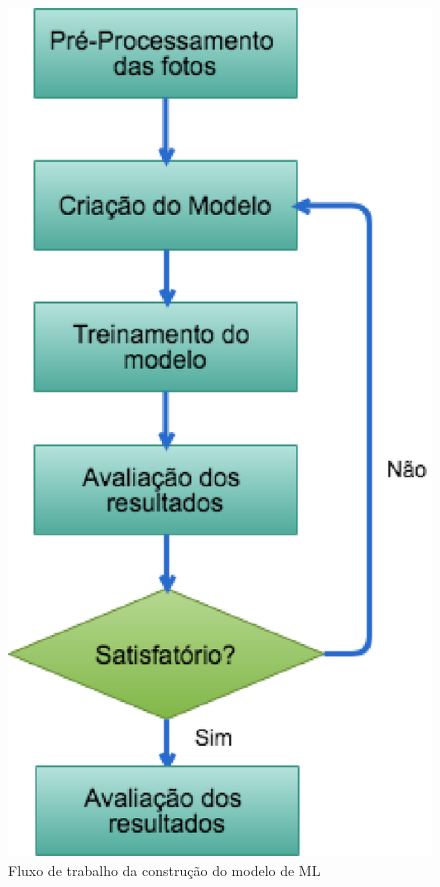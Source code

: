     \begin{figure}[ht]
        \centering
        \label{fig09}
            \includegraphics[keepaspectratio=true, scale=0.4]{editaveis/images/ml_nt_flow.eps}
        \caption{Fluxo de trabalho da construção do modelo de ML}
    \end{figure}

